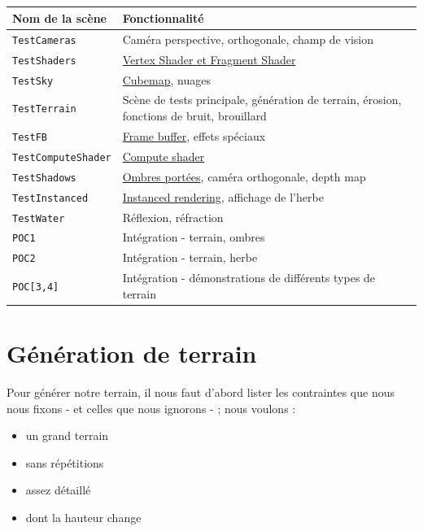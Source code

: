 \documentclass{EPUProjetDi}
\newcommand{\code}{\texttt}
\begin{document}
\paragraph{}
\begin{tabular}{|l|l|}
	\hline
	Nom de la scène & Fonctionnalité \\\hline\hline
	\code{TestCameras} & Caméra perspective, orthogonale, champ de vision\\\hline
	\code{TestShaders} & \hyperref[sec:shaders]{Vertex Shader et Fragment Shader}\\\hline
	\code{TestSky} & \hyperref[sec:sky]{Cubemap}, nuages\\\hline
	\code{TestTerrain} & \makecell[l]{Scène de tests principale, génération de terrain, érosion,\\ fonctions de bruit, brouillard}\\\hline
	\code{TestFB} & \hyperref[sec:framebuffers]{Frame buffer}, effets spéciaux\\\hline
	\code{TestComputeShader} & \hyperref[sec:shaders]{Compute shader}\\\hline
	\code{TestShadows} & \hyperref[sec:casted_shadows]{Ombres portées}, caméra orthogonale, depth map\\\hline
	\code{TestInstanced} & \hyperref[sec:instanced_rendering]{Instanced rendering}, affichage de l'herbe\\\hline
	\code{TestWater} & Réflexion, réfraction\\\hline
	\code{POC1} & Intégration - terrain, ombres\\\hline
	\code{POC2} & Intégration - terrain, herbe\\\hline
	\code{POC[3,4]} & Intégration - démonstrations de différents types de terrain\\\hline
\end{tabular}

\chapter{Génération de terrain}

Pour générer notre terrain, il nous faut d'abord lister les contraintes que nous nous fixons - et celles que nous ignorons - ; nous voulons :
\begin{itemize}
	\item{un grand terrain}
	\item{sans répétitions}
	\item{assez détaillé}
	\item{dont la hauteur change}
\end{itemize}
\end{document}
